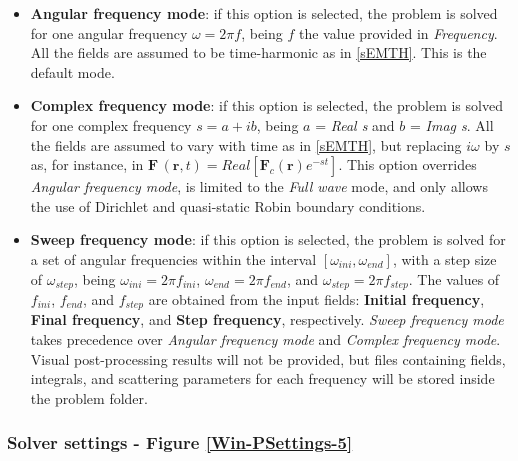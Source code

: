 \begin{itemize}\itemsep0.5em 
	\item \textbf{Angular frequency mode}: if this option is selected, the problem is solved for one angular frequency $\omega = 2 \pi f$, being $f$ the value provided in \textit{Frequency}. All the fields are assumed to be time-harmonic as in \ref{sEMTH}. This is the default mode. 
	\quad
	\item \textbf{Complex frequency mode}: if this option is selected, the problem is solved for one complex frequency $s = a + ib$, being $a$ = \textit{Real s} and $b$ = \textit{Imag s}. All the fields are assumed to vary with time as in \ref{sEMTH}, but replacing $i\omega$ by $s$ as, for instance, in $\mathbf{F}\,(\mathbf{r},t) = Real\left[\mathbf{F}_{c}(\mathbf{r})e^{-st}\right]$. This option overrides \emph{Angular frequency mode}, is limited to the \textit{Full wave} mode, and only allows the use of Dirichlet and quasi-static Robin boundary conditions.
	\quad
	\item \textbf{Sweep frequency mode}: if this option is selected, the problem is solved for a set of angular frequencies within the interval $[\omega_{ini}, \omega_{end}]$, with a step size of $\omega_{step}$, being $\omega_{ini} = 2 \pi f_{ini}$, $\omega_{end} = 2 \pi f_{end}$, and $\omega_{step} = 2 \pi f_{step}$. The values of $f_{ini}$, $f_{end}$, and $f_{step}$ are obtained from the input fields: \textbf{Initial frequency}, \textbf{Final frequency}, and \textbf{Step frequency}, respectively. \textit{Sweep frequency mode} takes precedence over \emph{Angular frequency mode} and \emph{Complex frequency mode}. Visual post-processing results will not be provided, but files containing fields, integrals, and scattering parameters for each frequency will be stored inside the problem folder.	
\end{itemize}

\subsubsection{Solver settings - Figure \ref{Win-PSettings-5}}\label{SolverSectionTab}

